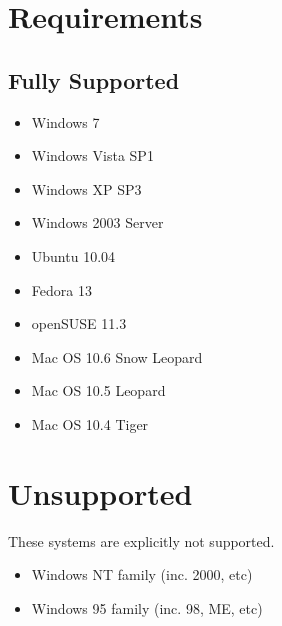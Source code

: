 \section{Requirements}

\subsection{Fully Supported}

\begin{itemize}
  \item Windows 7
  \item Windows Vista SP1
  \item Windows XP SP3
  \item Windows 2003 Server
  \item Ubuntu 10.04
  \item Fedora 13
  \item openSUSE 11.3
  \item Mac OS 10.6 Snow Leopard
  \item Mac OS 10.5 Leopard
  \item Mac OS 10.4 Tiger
\end{itemize}

\section{Unsupported}

These systems are explicitly not supported.

\begin{itemize}
  \item Windows NT family (inc. 2000, etc)
  \item Windows 95 family (inc. 98, ME, etc)
\end{itemize}
